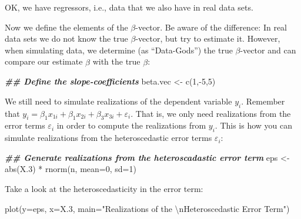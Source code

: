 \documentclass[
  14pt,
]{memoir}
\newenvironment{Shaded}{\begin{snugshade}}{\end{snugshade}}
\newcommand{\AttributeTok}[1]{\textcolor[rgb]{0.77,0.63,0.00}{#1}}
\newcommand{\DecValTok}[1]{\textcolor[rgb]{0.00,0.00,0.81}{#1}}
\newcommand{\DocumentationTok}[1]{\textcolor[rgb]{0.56,0.35,0.01}{\textbf{\textit{#1}}}}
\newcommand{\FloatTok}[1]{\textcolor[rgb]{0.00,0.00,0.81}{#1}}
\newcommand{\FunctionTok}[1]{\textcolor[rgb]{0.00,0.00,0.00}{#1}}
\newcommand{\NormalTok}[1]{#1}
\newcommand{\OtherTok}[1]{\textcolor[rgb]{0.56,0.35,0.01}{#1}}
\newcommand{\SpecialCharTok}[1]{\textcolor[rgb]{0.00,0.00,0.00}{#1}}
\newcommand{\StringTok}[1]{\textcolor[rgb]{0.31,0.60,0.02}{#1}}
\begin{document}
OK, we have regressors, i.e., data that we also have in real data sets.

Now we define the elements of the \(\beta\)-vector. Be aware of the difference: In real data sets we do not know the true \(\beta\)-vector, but try to estimate it. However, when simulating data, we determine (as ``Data-Gods'') the true \(\beta\)-vector and can compare our estimate \(\hat{\beta}\) with the true \(\beta\):

\begin{Shaded}
\begin{Highlighting}[]
\DocumentationTok{\#\# Define the slope{-}coefficients}
\NormalTok{beta.vec  }\OtherTok{\textless{}{-}} \FunctionTok{c}\NormalTok{(}\DecValTok{1}\NormalTok{,}\SpecialCharTok{{-}}\DecValTok{5}\NormalTok{,}\DecValTok{5}\NormalTok{)}
\end{Highlighting}
\end{Shaded}

\hfill\break
We still need to simulate realizations of the dependent variable \(y_i\). Remember that \(y_i=\beta_1 x_{1i}+\beta_1 x_{2i}+\beta_3 x_{3i}+\varepsilon_{i}\). That is, we only need realizations from the error terms \(\varepsilon_i\) in order to compute the realizations from \(y_i\). This is how you can simulate realizations from the heteroscedastic error terms \(\varepsilon_i\):

\begin{Shaded}
\begin{Highlighting}[]
\DocumentationTok{\#\# Generate realizations from the heteroscadastic error term}
\NormalTok{eps       }\OtherTok{\textless{}{-}} \FunctionTok{abs}\NormalTok{(X}\FloatTok{.3}\NormalTok{) }\SpecialCharTok{*} \FunctionTok{rnorm}\NormalTok{(n, }\AttributeTok{mean=}\DecValTok{0}\NormalTok{, }\AttributeTok{sd=}\DecValTok{1}\NormalTok{)}
\end{Highlighting}
\end{Shaded}

Take a look at the heteroscedasticity in the error term:

\begin{Shaded}
\begin{Highlighting}[]
\FunctionTok{plot}\NormalTok{(}\AttributeTok{y=}\NormalTok{eps, }\AttributeTok{x=}\NormalTok{X}\FloatTok{.3}\NormalTok{, }
     \AttributeTok{main=}\StringTok{"Realizations of the }\SpecialCharTok{\textbackslash{}n}\StringTok{Heteroscedastic Error Term"}\NormalTok{)}
\end{Highlighting}
\end{Shaded}
\end{document}
